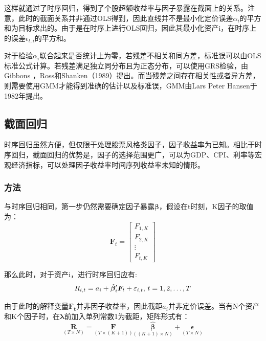 \documentclass[11pt]{article}
\begin{document}
这样就通过了时序回归，得到了个股超额收益率与因子暴露在截面上的关系。注意，此时的截面关系并非通过OLS得到，因此直线并不是最小化定价误差$\alpha_i$的平方和为目标求出的。由于是在时序上进行OLS回归，因此其最小化资产i，在时序上的误差$\epsilon_{t,i}$的平方和。

对于检验$\alpha_i$联合起来是否统计上为零，若残差不相关和同方差，标准误可以由OLS标准公式计算。若残差满足独立同分布且为正态分布，可以使用GRS检验，由Gibbons
，Ross和Shanken（1989）提出。而当残差之间存在相关性或者异方差，则需要使用GMM才能得到准确的估计以及标准误，GMM由Lars Peter Hansen于1982年提出。

\subsection{截面回归}

时序回归虽然方便，但仅限于处理股票风格类因子，因子收益率为已知。相比于时序回归，截面回归的优势是，因子的选择范围更广，可以为GDP、CPI、利率等宏观经济指标，可以处理因子收益率时间序列收益率未知的情形。

\subsubsection{方法}

与时序回归相同，第一步仍然需要确定因子暴露$\bm{\beta}$，假设在t时刻，K因子的取值为：
\begin{equation*}
    \bm{F}_t =
    \begin{bmatrix}
        F_{1,K} \\
        F_{2,K} \\
        \vdots \\
        F_{t,K} 
    \end{bmatrix}
\end{equation*}

那么此时，对于资产i，进行时序回归应有:
\begin{equation*}
    R_{i,t} = a_i + \hat{\bm{\beta}}_{i}' \bm{F}_t + \varepsilon_{i,t} ,\, t=1,2,\dots,T
\end{equation*}

由于此时的解释变量$\bm{F_t}$并非因子收益率，因此截距$a_i$并非定价误差。当有N个资产和K个因子时，在$\bm{\lambda}$前加入单列常数1为截距，矩阵形式有：
\begin{equation*}
    \underset{\scriptscriptstyle{(T \times N)}}{\bm{R}}
    = \underset{\scriptscriptstyle{\left(T \times (K+1)\right)}}{\bm{F}}
    \underset{\scriptscriptstyle{\left((K+1) \times N\right)}}{\hat{\bm{\beta}}} 
    + \underset{\scriptscriptstyle{(T \times N)}}{\bm{\epsilon}}
\end{equation*}
\end{document}
